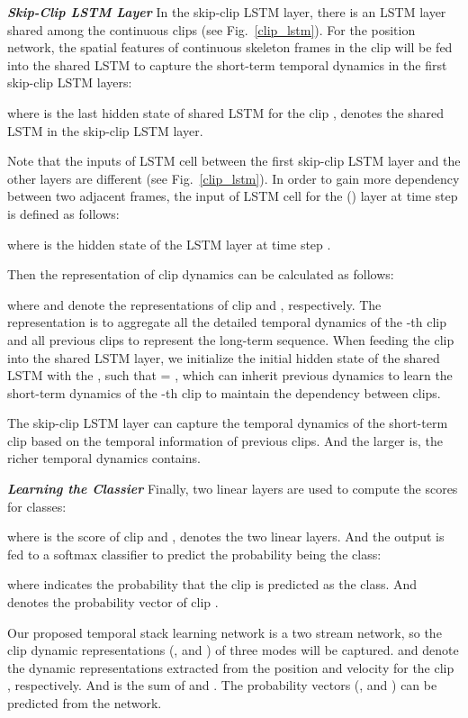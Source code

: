 \documentclass[runningheads]{llncs}
\begin{document}
\textbf{\emph{Skip-Clip LSTM Layer}} \hspace{3mm}
In the skip-clip LSTM layer, there is an LSTM layer shared among the continuous clips (see Fig.~\ref{clip_lstm}). For the position network, the spatial features of continuous skeleton frames in the clip  will be fed into the shared LSTM to capture the short-term temporal dynamics in the first skip-clip LSTM layers:

where  is the last hidden state of shared LSTM for the clip ,  denotes the shared LSTM in the skip-clip LSTM layer.

Note that the inputs of LSTM cell between the first skip-clip LSTM layer and the other layers are different (see Fig.~\ref{clip_lstm}). In order to gain more dependency between two adjacent frames, the input  of LSTM cell for the  () layer at time step  is defined as follows:

where  is the hidden state of the  LSTM layer at time step .

Then the representation of clip dynamics can be calculated as follows:

where  and  denote the representations of clip  and , respectively. The representation  is to aggregate all the detailed temporal dynamics of the -th clip and all previous clips to represent the long-term sequence. When feeding the clip  into the shared LSTM layer, we initialize the initial hidden state  of the shared LSTM with the , such that  = , which can inherit previous dynamics to learn the short-term dynamics of the -th clip to maintain the dependency between clips.

The skip-clip LSTM layer can capture the temporal dynamics of the short-term clip based on the temporal information of previous clips. And the larger  is, the richer temporal dynamics  contains.


\textbf{\emph{Learning the Classier}} \hspace{3mm}
Finally, two linear layers are used to compute the scores for  classes:

where  is the score of clip  and ,  denotes the two linear layers. And the output is fed to a softmax classifier to predict the probability being the  class:

where  indicates the probability that the clip  is predicted as the  class. And  denotes the probability vector of clip .


Our proposed temporal stack learning network is a two stream network, so the clip dynamic representations (,  and ) of three modes will be captured.  and  denote the dynamic representations extracted from the position and velocity for the clip , respectively. And  is the sum of  and . The probability vectors (,  and ) can be predicted from the network.
\end{document}
